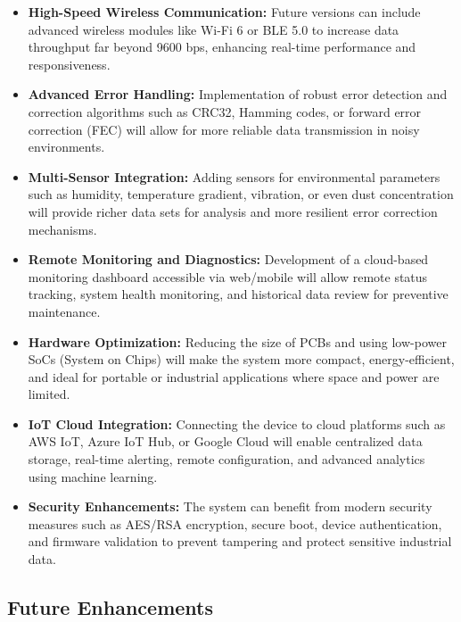\documentclass[12pt]{report}
\begin{document}
\begin{itemize}[leftmargin=*]
    \item \textbf{High-Speed Wireless Communication:} Future versions can include advanced wireless modules like Wi-Fi 6 or BLE 5.0 to increase data throughput far beyond 9600 bps, enhancing real-time performance and responsiveness.

    \item \textbf{Advanced Error Handling:} Implementation of robust error detection and correction algorithms such as CRC32, Hamming codes, or forward error correction (FEC) will allow for more reliable data transmission in noisy environments.

    \item \textbf{Multi-Sensor Integration:} Adding sensors for environmental parameters such as humidity, temperature gradient, vibration, or even dust concentration will provide richer data sets for analysis and more resilient error correction mechanisms.

    \item \textbf{Remote Monitoring and Diagnostics:} Development of a cloud-based monitoring dashboard accessible via web/mobile will allow remote status tracking, system health monitoring, and historical data review for preventive maintenance.

    \item \textbf{Hardware Optimization:} Reducing the size of PCBs and using low-power SoCs (System on Chips) will make the system more compact, energy-efficient, and ideal for portable or industrial applications where space and power are limited.

    \item \textbf{IoT Cloud Integration:} Connecting the device to cloud platforms such as AWS IoT, Azure IoT Hub, or Google Cloud will enable centralized data storage, real-time alerting, remote configuration, and advanced analytics using machine learning.

    \item \textbf{Security Enhancements:} The system can benefit from modern security measures such as AES/RSA encryption, secure boot, device authentication, and firmware validation to prevent tampering and protect sensitive industrial data.
\end{itemize}

\clearpage

\subsection*{Future Enhancements}
\end{document}
